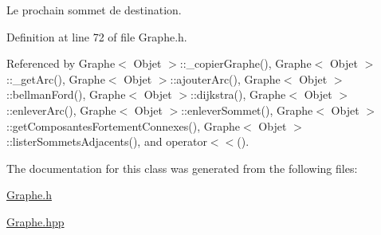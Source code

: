 Le prochain sommet de destination. 



Definition at line 72 of file Graphe.h.



Referenced by Graphe$<$ Objet $>$::\_\-copierGraphe(), Graphe$<$ Objet $>$::\_\-getArc(), Graphe$<$ Objet $>$::ajouterArc(), Graphe$<$ Objet $>$::bellmanFord(), Graphe$<$ Objet $>$::dijkstra(), Graphe$<$ Objet $>$::enleverArc(), Graphe$<$ Objet $>$::enleverSommet(), Graphe$<$ Objet $>$::getComposantesFortementConnexes(), Graphe$<$ Objet $>$::listerSommetsAdjacents(), and operator$<$$<$().



The documentation for this class was generated from the following files:\begin{DoxyCompactItemize}
\item 
\hyperlink{_graphe_8h}{Graphe.h}\item 
\hyperlink{_graphe_8hpp}{Graphe.hpp}\end{DoxyCompactItemize}
